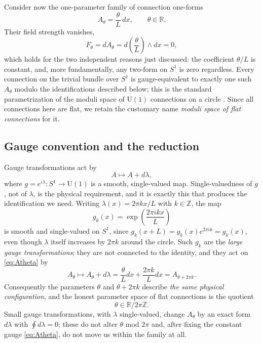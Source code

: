 \documentclass[11pt,reqno]{amsart}
\theoremstyle{plain}
\theoremstyle{definition}
\newcommand{\Rr}{\mathbb{R}}
\newcommand{\Zz}{\mathbb{Z}}
\newcommand{\Uone}{\mathrm{U}(1)}
\begin{document}
Consider now the one-parameter family of connection one-forms
\begin{equation}\label{eq:Atheta}
A_\theta=\frac{\theta}{L}\,dx,
\qquad
\theta\in\Rr .
\end{equation}
Their field strength vanishes,
\begin{equation}\label{eq:Ftheta}
F_\theta=dA_\theta=d\!\left(\frac{\theta}{L}\right)\wedge dx=0,
\end{equation}
which holds for the two independent reasons just discussed: the coefficient $\theta/L$ is
constant, and, more fundamentally, any two-form on $S^1$ is zero regardless. Every connection on
the trivial bundle over $S^1$ is gauge-equivalent to exactly one such $A_\theta$ modulo the
identifications described below; this is the standard parametrization of the moduli space of
$\Uone$ connections on a circle \cite{Kobayashi,NakaharaBook,BaezMuniain}. Since all connections
here are flat, we retain the customary name \emph{moduli space of flat connections} for it.

\subsection{Gauge convention and the reduction}

Gauge transformations act by
\begin{equation}\label{eq:gauge}
A\longmapsto A+d\lambda ,
\end{equation}
where $g=e^{i\lambda}\colon S^1\to\Uone$ is a smooth, single-valued map. Single-valuedness of $g$,
not of $\lambda$, is the physical requirement, and it is exactly this that produces the
identification we need. Writing $\lambda(x)=2\pi k x/L$ with $k\in\Zz$, the map
\begin{equation}\label{eq:largegauge}
g_k(x)=\exp\!\left(\frac{2\pi i k x}{L}\right)
\end{equation}
is smooth and single-valued on $S^1$, since $g_k(x+L)=g_k(x)e^{2\pi i k}=g_k(x)$, even though
$\lambda$ itself increases by $2\pi k$ around the circle. Such $g_k$ are the \emph{large gauge
transformations}; they are not connected to the identity, and they act on \eqref{eq:Atheta} by
\begin{equation}\label{eq:largegauge-action}
A_\theta\longmapsto A_\theta+d\lambda=\frac{\theta}{L}dx+\frac{2\pi k}{L}dx=A_{\theta+2\pi k}.
\end{equation}
Consequently the parameters $\theta$ and $\theta+2\pi k$ describe \emph{the same physical
configuration}, and the honest parameter space of flat connections is the quotient
\begin{equation}\label{eq:theta-quotient}
\theta\in\Rr/2\pi\Zz .
\end{equation}
Small gauge transformations, with $\lambda$ single-valued, change $A_\theta$ by an exact form
$d\lambda$ with $\oint d\lambda=0$; these do not alter $\theta$ mod $2\pi$ and, after fixing the
constant gauge \eqref{eq:Atheta}, do not move us within the family at all.
\end{document}
